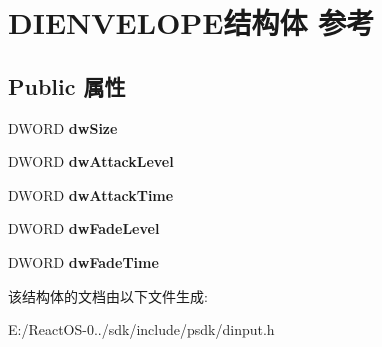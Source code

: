 \hypertarget{struct_d_i_e_n_v_e_l_o_p_e}{}\section{D\+I\+E\+N\+V\+E\+L\+O\+P\+E结构体 参考}
\label{struct_d_i_e_n_v_e_l_o_p_e}
\subsection*{Public 属性}
\begin{DoxyCompactItemize}
\item 
\mbox{\label{struct_d_i_e_n_v_e_l_o_p_e_acc09a52f3a79c6342b752232023eb1ca}} 
D\+W\+O\+RD {\bfseries dw\+Size}
\item 
\mbox{\label{struct_d_i_e_n_v_e_l_o_p_e_a121eabd147a26ee01ded94a067afdea1}} 
D\+W\+O\+RD {\bfseries dw\+Attack\+Level}
\item 
\mbox{\label{struct_d_i_e_n_v_e_l_o_p_e_a633c3f494b3b3a3207adf978f4332465}} 
D\+W\+O\+RD {\bfseries dw\+Attack\+Time}
\item 
\mbox{\label{struct_d_i_e_n_v_e_l_o_p_e_a7711d14aa85e64421f15403867ac4ee4}} 
D\+W\+O\+RD {\bfseries dw\+Fade\+Level}
\item 
\mbox{\label{struct_d_i_e_n_v_e_l_o_p_e_aa713f947869bc1d295cd4da6584d024b}} 
D\+W\+O\+RD {\bfseries dw\+Fade\+Time}
\end{DoxyCompactItemize}


该结构体的文档由以下文件生成\+:\begin{DoxyCompactItemize}
\item 
E\+:/\+React\+O\+S-\/0../sdk/include/psdk/dinput.\+h\end{DoxyCompactItemize}
